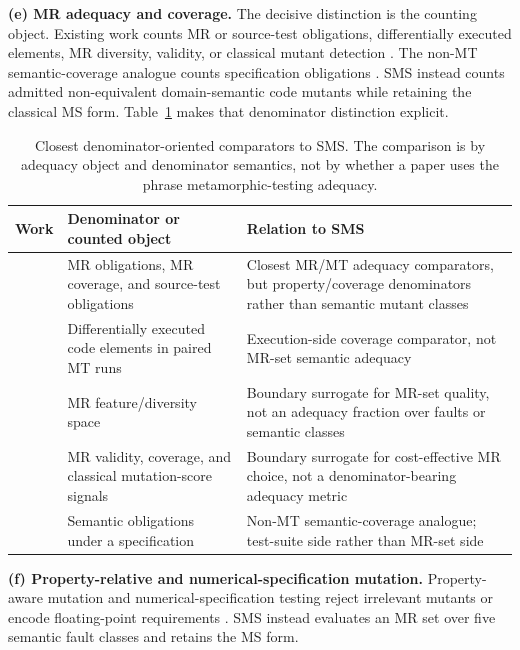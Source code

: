 \documentclass[review,12pt,authoryear]{elsarticle}
\begin{document}
\textbf{(e) MR adequacy and coverage.} The decisive distinction is the
counting object. Existing work counts MR or source-test obligations,
differentially executed elements, MR diversity, validity, or classical
mutant detection
\citep{xiang2019compositeMR,fu2024mtadequacy,liu2024mtcoverage,ba2025metamorphiccoverage,xie2024mutmodel,huang2022mrprioritization,zhang2022effectivemrselection}.
The non-MT semantic-coverage analogue counts specification obligations
\citep{302e9d254f138148abce2feda1319f9cb32cd914}. SMS instead counts
admitted non-equivalent domain-semantic code mutants while retaining the
classical MS form.
Table~\ref{tab:closest-denominator-comparators} makes that denominator
distinction explicit.

\begin{table}[t]
\centering
\footnotesize
\caption{Closest denominator-oriented comparators to SMS. The comparison
is by adequacy object and denominator semantics, not by whether a paper
uses the phrase metamorphic-testing adequacy.}
\label{tab:closest-denominator-comparators}
\begin{tabularx}{\textwidth}{p{}p{}X}
\toprule
Work & Denominator or counted object & Relation to SMS \\
\midrule
\citep{fu2024mtadequacy,liu2024mtcoverage} & MR obligations, MR coverage, and source-test obligations & Closest MR/MT adequacy comparators, but property/coverage denominators rather than semantic mutant classes \\
\citep{ba2025metamorphiccoverage} & Differentially executed code elements in paired MT runs & Execution-side coverage comparator, not MR-set semantic adequacy \\
\citep{xie2024mutmodel} & MR feature/diversity space & Boundary surrogate for MR-set quality, not an adequacy fraction over faults or semantic classes \\
\citep{huang2022mrprioritization,zhang2022effectivemrselection} & MR validity, coverage, and classical mutation-score signals & Boundary surrogate for cost-effective MR choice, not a denominator-bearing adequacy metric \\
\citep{302e9d254f138148abce2feda1319f9cb32cd914} & Semantic obligations under a specification & Non-MT semantic-coverage analogue; test-suite side rather than MR-set side \\
\bottomrule
\end{tabularx}
\end{table}

\textbf{(f) Property-relative and numerical-specification mutation.}
Property-aware mutation and numerical-specification testing reject
irrelevant mutants or encode floating-point requirements
\citep{0ed19a2ecb5537dbf1c5f25a818f45a34d418ae8,525d0597f3b46f6b8dc6e0ee1e0cd507d23dc22b}.
SMS instead evaluates an MR set over five semantic fault classes and
retains the MS form.
\end{document}
